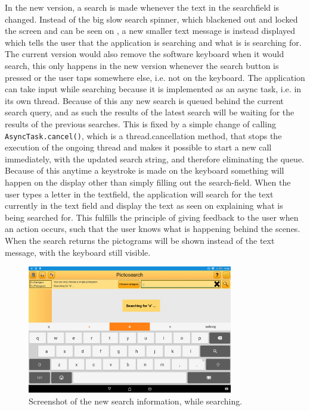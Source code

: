 In the new version, a search is made whenever the text in the searchfield is changed.
Instead of the big slow search spinner, which blackened out and locked the screen and can be seen on , a new smaller text message is instead displayed which tells the user that the application is searching and what is is searching for. 
The current version would also remove the software keyboard when it would search, this only happens in the new version whenever the search button is pressed or the user taps somewhere else, i.e. not on the keyboard.
The application can take input while searching because it is implemented as an async task, i.e. in its own thread.
Because of this any new search is queued behind the current search query, and as such the results of the latest search will be waiting for the results of the previous searches.
This is fixed by a simple change of calling \texttt{AsyncTask.cancel()}, which is a thread.cancellation method, that stops the execution of the ongoing thread and makes it possible to start a new call immediately, with the updated search string, and therefore eliminating the queue.
Because of this anytime a keystroke is made on the keyboard something will happen on the display other than simply filling out the search-field.
When the user types a letter in the textfield, the application will search for the text currently in the text field and display the text as seen on  explaining what is being searched for. 
This fulfills the principle of giving feedback to the user when an action occurs, such that the user knows what is happening behind the scenes.
When the search returns the pictograms will be shown instead of the text message, with the keyboard still visible.

\begin{figure}[h]
    \centering
    \includegraphics[width=0.8\textwidth]{figures/img/screenshots/new_dialog.png}
    \caption{Screenshot of the new search information, while searching.}\label{fig:screenshot_newsearch}
\end{figure}

